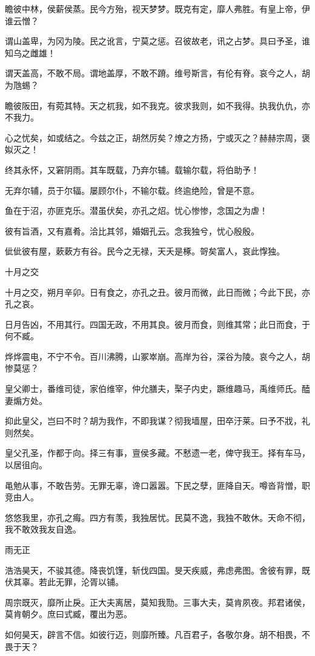 瞻彼中林，侯薪侯蒸。民今方殆，视天梦梦。既克有定，靡人弗胜。有皇上帝，伊谁云憎？

谓山盖卑，为冈为陵。民之讹言，宁莫之惩。召彼故老，讯之占梦。具曰予圣，谁知乌之雌雄！

谓天盖高，不敢不局。谓地盖厚，不敢不蹐。维号斯言，有伦有脊。哀今之人，胡为虺蜴？

瞻彼阪田，有菀其特。天之杌我，如不我克。彼求我则，如不我得。执我仇仇，亦不我力。

心之忧矣，如或结之。今兹之正，胡然厉矣？燎之方扬，宁或灭之？赫赫宗周，褒姒灭之！

终其永怀，又窘阴雨。其车既载，乃弃尔辅。载输尔载，将伯助予！

无弃尔辅，员于尔辐。屡顾尔仆，不输尔载。终逾绝险，曾是不意。

鱼在于沼，亦匪克乐。潜虽伏矣，亦孔之炤。忧心惨惨，念国之为虐！

彼有旨酒，又有嘉肴。洽比其邻，婚姻孔云。念我独兮，忧心殷殷。

佌佌彼有屋，蔌蔌方有谷。民今之无禄，天夭是椓。哿矣富人，哀此惸独。

十月之交

十月之交，朔月辛卯。日有食之，亦孔之丑。彼月而微，此日而微；今此下民，亦孔之哀。

日月告凶，不用其行。四国无政，不用其良。彼月而食，则维其常；此日而食，于何不臧。

烨烨震电，不宁不令。百川沸腾，山冢崒崩。高岸为谷，深谷为陵。哀今之人，胡惨莫惩？

皇父卿士，番维司徒，家伯维宰，仲允膳夫，棸子内史，蹶维趣马，禹维师氏。醘妻煽方处。

抑此皇父，岂曰不时？胡为我作，不即我谋？彻我墙屋，田卒汙莱。曰予不戕，礼则然矣。

皇父孔圣，作都于向。择三有事，亶侯多藏。不慭遗一老，俾守我王。择有车马，以居徂向。

黾勉从事，不敢告劳。无罪无辜，谗口嚣嚣。下民之孽，匪降自天。噂沓背憎，职竞由人。

悠悠我里，亦孔之痗。四方有羡，我独居忧。民莫不逸，我独不敢休。天命不彻，我不敢效我友自逸。

雨无正

浩浩昊天，不骏其德。降丧饥馑，斩伐四国。旻天疾威，弗虑弗图。舍彼有罪，既伏其辜。若此无罪，沦胥以铺。

周宗既灭，靡所止戾。正大夫离居，莫知我勚。三事大夫，莫肯夙夜。邦君诸侯，莫肯朝夕。庶曰式臧，覆出为恶。

如何昊天，辟言不信。如彼行迈，则靡所臻。凡百君子，各敬尔身。胡不相畏，不畏于天？

